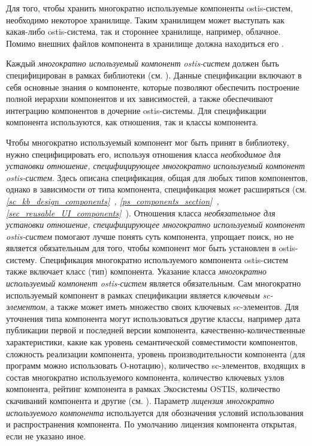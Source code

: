 Для того, чтобы хранить многократно используемые компоненты ostis-систем, необходимо некоторое хранилище. Таким хранилищем может выступать как какая-либо ostis-система, так и стороннее хранилище, например, облачное. Помимо внешних файлов компонента в хранилище должна находиться его .

Каждый \textit{многократно используемый компонент ostis-систем} должен быть специфицирован в рамках библиотеки (см. ). Данные спецификации включают в себя основные знания о компоненте, которые позволяют обеспечить построение полной иерархии компонентов и их зависимостей, а также обеспечивают  интеграцию компонентов в дочерние ostis-системы. Для спецификации компонента используются, как отношения, так и классы компонента.

Чтобы многократно используемый компонент мог быть принят в библиотеку, нужно специфицировать его, используя отношения класса \textit{необходимое для установки отношение, специфицирующее многократно используемый компонент ostis-систем}. Здесь описана спецификация, общая для любых типов компонентов, однако в зависимости от типа компонента, спецификация может расширяться (см. \textit{\ref{sc_kb_design_components}~, \ref{ps_components_section}~, \ref{sec_reusable_UI_components}~}). Отношения класса \textit{необязательное для установки отношение, специфицирующее многократно используемый компонент ostis-систем} помогают лучше понять суть компонента, упрощает поиск, но не является обязательным для того, чтобы компонент мог быть установлен в ostis-систему. Спецификация многократно используемого компонента ostis-систем также включает класс (тип) компонента. Указание класса \textit{многократно используемый компонент ostis-систем} является обязательным. Сам многократно используемый компонент в рамках спецификации является \textit{ключевым sc-элементом}, а также может иметь множество своих ключевых sc-элементов. Для уточнения типа компонента могут использоваться другие классы, например дата публикации первой и последней версии компонента, качественно-количественные характеристики, какие как уровень семантической совместимости компонентов, сложность реализации компонента, уровень производительности компонента (для программ можно использовать O-нотацию), количество sc-элементов, входящих в состав многократно используемого компонента, количество ключевых узлов компонента, рейтинг компонента в рамках Экосистемы OSTIS, количество скачиваний компонента и другие (см. ). Параметр \textit{лицензия многократно используемого компонента} используется для обозначения условий использования и распространения компонента. По умолчанию лицензия компонента открытая, если не указано иное.

